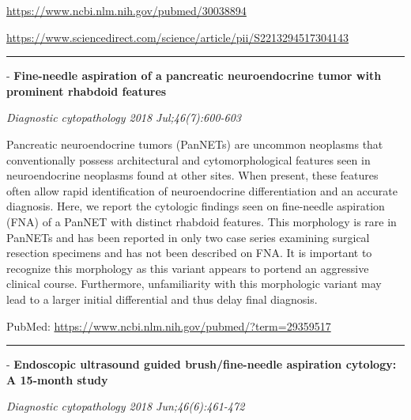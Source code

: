 \documentclass[]{article}
\begin{document}
\url{https://www.ncbi.nlm.nih.gov/pubmed/30038894}

\url{https://www.sciencedirect.com/science/article/pii/S2213294517304143}

\begin{center}\rule{0.5\linewidth}{\linethickness}\end{center}

 - \textbf{Fine-needle aspiration of a pancreatic neuroendocrine tumor
with prominent rhabdoid features}

\emph{Diagnostic cytopathology 2018 Jul;46(7):600-603}

Pancreatic neuroendocrine tumors (PanNETs) are uncommon neoplasms that
conventionally possess architectural and cytomorphological features seen
in neuroendocrine neoplasms found at other sites. When present, these
features often allow rapid identification of neuroendocrine
differentiation and an accurate diagnosis. Here, we report the cytologic
findings seen on fine-needle aspiration (FNA) of a PanNET with distinct
rhabdoid features. This morphology is rare in PanNETs and has been
reported in only two case series examining surgical resection specimens
and has not been described on FNA. It is important to recognize this
morphology as this variant appears to portend an aggressive clinical
course. Furthermore, unfamiliarity with this morphologic variant may
lead to a larger initial differential and thus delay final diagnosis.

PubMed: \url{https://www.ncbi.nlm.nih.gov/pubmed/?term=29359517}

{}

{}

\begin{center}\rule{0.5\linewidth}{\linethickness}\end{center}

 - \textbf{Endoscopic ultrasound guided brush/fine-needle aspiration
cytology: A 15-month study}

\emph{Diagnostic cytopathology 2018 Jun;46(6):461-472}
\end{document}
